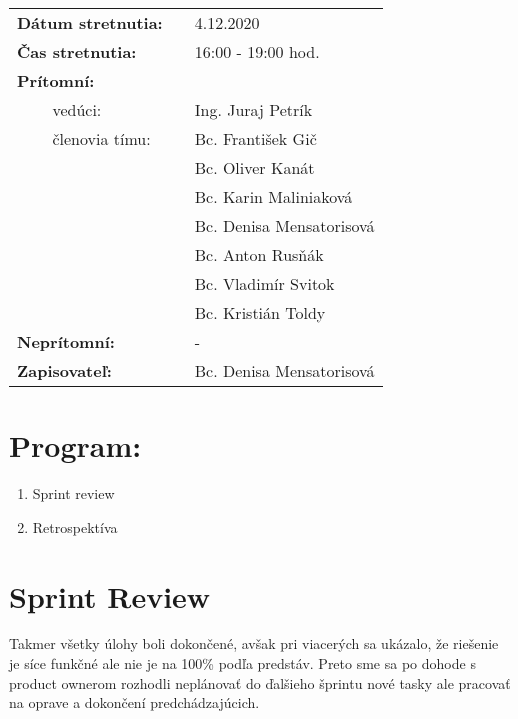 \documentclass{article}
\begin{document}
    

    \begin{table}[h]
        \begin{tabular}{lllll}
            \multicolumn{3}{l}{\textbf{Dátum stretnutia:}} & & 4.12.2020 \\
            \multicolumn{3}{l}{\textbf{Čas stretnutia:}} & & 16:00 - 19:00 hod. \\
            \multicolumn{3}{l}{\textbf{Prítomní:}} \\
            & & vedúci: & & Ing. Juraj Petrík \\
            & & členovia tímu: & & Bc. František Gič  \\
            & & & & Bc. Oliver Kanát \\
            & & & & Bc. Karin Maliniaková \\
            & & & & Bc. Denisa Mensatorisová \\
            & & & & Bc. Anton Rusňák \\
            & & & & Bc. Vladimír Svitok \\
            & & & & Bc. Kristián Toldy \\
            \multicolumn{3}{l}{\textbf{Neprítomní:}} & & -\\
            \multicolumn{3}{l}{\textbf{Zapisovateľ:}} & & Bc. Denisa Mensatorisová \\
        \end{tabular}
        \label{tab:grades}
    \end{table}

    \section*{Program:}
    
    \begin{enumerate}
        \item Sprint review 
        \item Retrospektíva
    \end{enumerate}

    \section*{Sprint Review}

        \textnormal {Takmer všetky úlohy boli dokončené, avšak pri viacerých sa ukázalo, že riešenie je síce funkčné ale nie je na 100\% podľa predstáv. 
        Preto sme sa po dohode s product ownerom rozhodli neplánovať do ďalšieho šprintu nové tasky ale pracovať na oprave a dokončení predchádzajúcich.}
\end{document}

